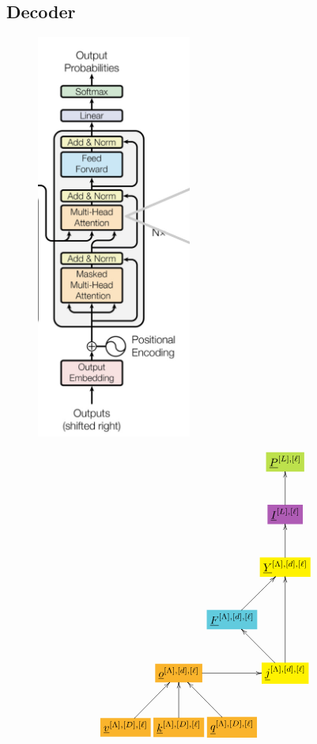 \subsection{Decoder}

\begin{figure}[h!]\centering
\begin{minipage}{.4\linewidth}
\includegraphics[width=2in]{transformer/decoder.jpg}
\end{minipage}%
\begin{minipage}{.6\linewidth}
$$\xymatrix@R=2.5pc@C=0.2pc{
&&&*+[F*:SpringGreen]{\underline{P}^{[L],[\ell]}}
\\
&&&*+[F*:Orchid]{\underline{I}^{[L],[\ell]}}\ar[u]
\\
&&&*+[F*:yellow]{\underline{Y}^{[\Lambda],[d], [\ell]}}\ar[u]
\\
&&*+[F*:SkyBlue]{\underline{F}^{[\Lambda],[d], [\ell]}}\ar[ur]&
\\
&*+[F*:Dandelion]{\underline{o}^{[\Lambda],[d],[\ell]}}\ar[rr]&&*+[F*:yellow]{\underline{j}^{[\Lambda],[d], [\ell]}}\ar[ul]\ar[uu]
\\
*+[F*:Dandelion]{\underline{v}^{[\Lambda],[D], [\ell]}}\ar[ur]&*+[F*:Dandelion]{\underline{k}^{[\Lambda],[D], [\ell]}}\ar[u]&*+[F*:Dandelion]{\underline{q}^{[\Lambda],[D], [\ell]}}\ar[ul]&
\\
}$$
\end{minipage}
\end{figure}
